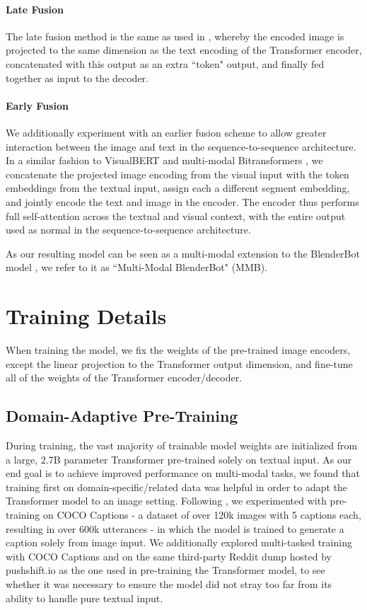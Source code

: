 \documentclass[11pt,a4paper]{article}
\begin{document}
\paragraph{Late Fusion} The late fusion method is the same as used in \citet{shuster2019dialogue}, whereby the encoded image is projected to the same dimension as the text encoding of the Transformer encoder, concatenated with this output as an extra ``token" output, and finally fed together as input to the decoder.
\paragraph{Early Fusion}
We additionally experiment with an earlier fusion scheme to allow greater interaction between the image and text in the sequence-to-sequence architecture. In a similar fashion to VisualBERT \cite{li2019visualbert} and multi-modal Bitransformers \cite{kiela2019supervised}, we concatenate the projected image encoding from the visual input with the token embeddings from the textual input, assign each a different segment embedding, and jointly encode the text and image in the encoder. The encoder thus performs full self-attention across the textual and visual context, with the entire output used as normal in the sequence-to-sequence architecture.

As our resulting model can be seen as a multi-modal extension to the BlenderBot model \cite{roller2020recipes}, we refer to it as ``Multi-Modal BlenderBot" (MMB).

\section{Training Details}
When training the model, we fix the weights of the pre-trained image encoders, except the linear projection to the Transformer output dimension, and fine-tune all of the weights of the Transformer encoder/decoder.
\subsection{Domain-Adaptive Pre-Training}
During training, the vast majority of trainable model weights are initialized from a large, 2.7B parameter Transformer pre-trained solely on textual input. As our end goal is to achieve improved performance on multi-modal tasks, we found that training first on domain-specific/related data was helpful in order to adapt the Transformer model to an image setting. Following \cite{singh2020pretraining}, we experimented with pre-training on COCO Captions \cite{chen2015microsoft} - a dataset of over 120k images with 5 captions each, resulting in over 600k utterances - in which the model is trained to generate a caption solely from image input. We additionally explored multi-tasked training with COCO Captions and on the same third-party Reddit dump hosted by pushshift.io \cite{baumgartner2020pushshift} as the one used in pre-training the Transformer model, to see whether it was necessary to ensure the model did not stray too far from its ability to handle pure textual input.
\end{document}
